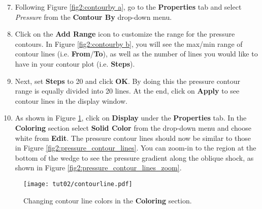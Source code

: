 \begin{enumerate}[label=\arabic*)]
	\setcounter{enumi}{6}
	\item Following Figure \ref{fig2:contourby a}, go to the \textbf{Properties} tab and select \textit{Pressure} from the \textbf{Contour By} drop-down menu.
	\item Click on the \textbf{Add Range} icon to customize the range for the pressure contours. In Figure \ref{fig2:contourby b}, you will see the max/min range of contour lines (i.e. \textbf{From}/\textbf{To}), as well as the number of lines you would like to have in your contour plot (i.e. \textbf{Steps}).
	\item Next, set \textbf{Steps} to 20 and click \textbf{OK}. By doing this the pressure contour range is equally divided into 20 lines. At the end, click on \textbf{Apply} to see contour lines in the display window.
	\item As shown in Figure \ref{fig2:colorby2}, click on \textbf{Display} under the \textbf{Properties} tab. In the \textbf{Coloring} section select \textbf{Solid Color} from the drop-down menu and choose white from \textbf{Edit}. The pressure contour lines should now be similar to those in Figure \ref{fig2:pressure_contour_lines}. You can zoom-in to the region at the bottom of the wedge to see the pressure gradient along the oblique
	shock, as shown in Figure \ref{fig2:pressure_contour_lines_zoom}.
\end{enumerate}





\begin{figure}[ht]
    \centering
    \texttt{[image: tut02/contourline.pdf]}
    \caption{Changing contour line colors in the \textbf{Coloring} section.}
    \label{fig2:colorby2}
\end{figure}

